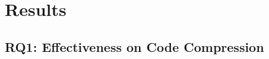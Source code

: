\documentclass[10pt,conference]{IEEEtran}
\newcommand{\todoc}[2]{{\textcolor{#1}{\textbf{[#2]}}}}
\newcommand{\shi}[1]{\todoc{orange}{Shi: #1}}
\begin{document}


\section{Results}

\subsection{RQ1: Effectiveness on Code Compression}
\end{document}

